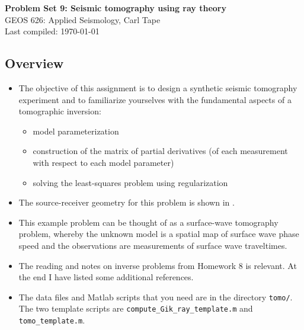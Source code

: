 \documentclass[11pt,titlepage,fleqn]{article}
\begin{document}

\begin{spacing}{1.2}
\centering
{\large \bf Problem Set 9: Seismic tomography using ray theory} \\
GEOS 626: Applied Seismology, Carl Tape \\
Last compiled: \today
\end{spacing}


\subsection*{Overview}

\begin{itemize}
\item The objective of this assignment is to design a synthetic seismic tomography experiment and to familiarize yourselves with the fundamental aspects of a tomographic inversion:
%
\begin{itemize}
\item model parameterization
\item construction of the matrix of partial derivatives (of each measurement with respect to each model parameter)
\item solving the least-squares problem using regularization
\end{itemize}

\item The source-receiver geometry for this problem is shown in .

\item This example problem can be thought of as a surface-wave tomography problem, whereby the unknown model is a spatial map of surface wave phase speed and the observations are measurements of surface wave traveltimes.

\item The reading and notes on inverse problems from Homework 8 is relevant.
At the end I have listed some additional references.
\nocite{Tape2007,Menke,AsterE2,Tarantola2005}

\item 
The data files and Matlab scripts that you need are in the directory \verb+tomo/+. The two template scripts are \verb+compute_Gik_ray_template.m+ and \verb+tomo_template.m+.

\end{itemize}
\end{document}
